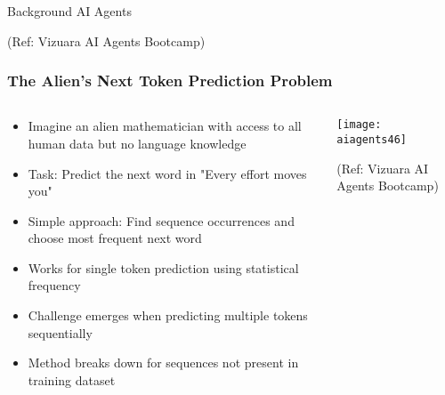 \begin{frame}[fragile]\frametitle{}
\begin{center}
{\Large Background AI Agents}

{\tiny (Ref: Vizuara AI Agents Bootcamp)}
\end{center}
\end{frame}

\begin{frame}[fragile]\frametitle{The Alien's Next Token Prediction Problem}

\begin{columns}
    \begin{column}[T]{0.6\linewidth}
      \begin{itemize}
	  \item Imagine an alien mathematician with access to all human data but no language knowledge
	  \item Task: Predict the next word in "Every effort moves you"
	  \item Simple approach: Find sequence occurrences and choose most frequent next word
	  \item Works for single token prediction using statistical frequency
	  \item Challenge emerges when predicting multiple tokens sequentially
	  \item Method breaks down for sequences not present in training dataset
	  \end{itemize}

    \end{column}
    \begin{column}[T]{0.4\linewidth}
		\begin{center}
		\texttt{[image: aiagents46]}

		{\tiny (Ref: Vizuara AI Agents Bootcamp)}

		\end{center}	
    \end{column}
  \end{columns}
  
\end{frame}

